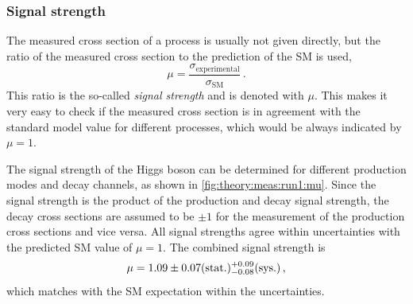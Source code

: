 \subsubsection{Signal strength}\label{subsub:theory:meas:run1:mu}

The measured cross section of a process is usually not given directly, but the ratio of the measured cross section
to the prediction of the SM is used,
\begin{equation}
    \label{eq:theo:mu}
    \mu = \frac{\sigma_\text{experimental}}{\sigma_\text{SM}} \,.
\end{equation}
This ratio is the so-called \emph{signal strength} and is denoted with $\mu$.
This makes it very easy to check if the measured cross section is in agreement with the standard model value for different processes, which would be
always indicated by $\mu = 1$.

The signal strength of the Higgs boson can be determined for different production modes and decay channels, as shown in \cref{fig:theory:meas:run1:mu}.
Since the signal strength is the product of the production and decay signal strength,
the decay cross sections are assumed to be $\pm1$ for the measurement of the production cross sections and vice versa.
All signal strengths agree within uncertainties with the predicted SM value of $\mu = 1$.
The combined signal strength is~\cite{HiggsMuCombined}
\begin{equation}
    \mu = 1.09 \pm  0.07 \text{(stat.)} {}^{+{0.09}}_{-{0.08}} \text{(sys.)} \,,
\end{equation}
which matches with the SM expectation within the uncertainties.


